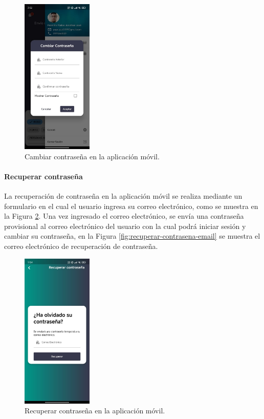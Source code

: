 \begin{figure}[H]
    \centering
    \includegraphics[width=0.3\textwidth]{chapters/III-resultados-y-discusion/resources/images/cambiar-contrasena-movil.png}
    \caption{Cambiar contraseña en la aplicación móvil.}
    \label{fig:cambiar-contrasena-movil}
\end{figure}

\paragraph{Recuperar contraseña}
La recuperación de contraseña en la aplicación móvil se realiza mediante un formulario en el cual el usuario ingresa su correo electrónico,
como se muestra en la Figura \ref{fig:recuperar-contrasena-movil}. Una vez ingresado el correo electrónico, se envía una contraseña provisional
al correo electrónico del usuario con la cual podrá iniciar sesión y cambiar su contraseña, en la Figura \ref{fig:recuperar-contrasena-email}
se muestra el correo electrónico de recuperación de contraseña.

\begin{figure}[H]
    \centering
    \includegraphics[width=0.3\textwidth]{chapters/III-resultados-y-discusion/resources/images/recuperar-contrasena-movil.png}
    \caption{Recuperar contraseña en la aplicación móvil.}
    \label{fig:recuperar-contrasena-movil}
\end{figure}

